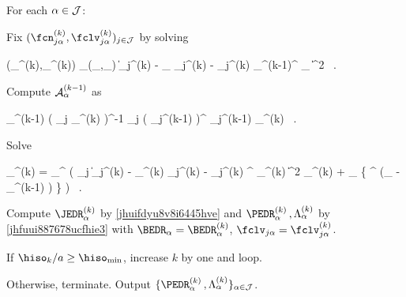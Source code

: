 \begin{mylist}
	\item
	For each \( \alpha \in \mathcal{J} \):
\begin{mylist}
	\item
	Fix \( (\fcn_{\jjl}^{(k)},\fclv_{\jjl}^{(k)})_{j \in \JJJ} \) by solving 
\begin{EQA}[c]
	(\fcn_{\jjl}^{(k)},\fclv_{\jjl}^{(k)})
	\eqdef
	\arginf_{(\fcn_{\jjl},\fclv_{\jjl})}
	\bigl\| \Imav_{j}^{(k)} - \fcn_{\jjl} \Sv_{j}^{(k)} - \UV_{j}^{(k)} {\PEDR_{\jl}^{(k-1)}}^{\T} \fclv_{\jjl} \bigr\|^{2}
	\, .
	\qquad
\label{kiiilfduy543rbgckr7r}
\end{EQA}
%
	\item
	Compute \( \mathcal{A}_{\alpha}^{(k-1)} \) as
\begin{EQA}[c]
	\IEDR_{\jl}^{(k-1)}
	\eqdef
	\biggl( \sum_{j \in \JJJ} \weightM_{\jjl}^{(k)} \biggr)^{-1} 
	\sum_{j \in \JJJ} \bigl( \PEDR_{j}^{(k-1)} \bigr)^{\T} \PEDR_{j}^{(k-1)} \; \weightM_{\jjl}^{(k)}
	\, .
\label{jfu88uuujpvue2rchuu}
\end{EQA}

%
	\item
	Solve
\begin{EQA}[c]
	\BEDR_{\jl}^{(k)}
	=
	\arginf_{\BEDR \in \R^{\dimm \times \dimd}} \biggl( \sum_{j \in \JJJ}
		\bigl\| \Imav_{j}^{(k)} - \fcn_{\jjl}^{(k)} \Sv_{j}^{(k)} - \UV_{j}^{(k)} \BEDR^{\T} \fclv_{\jjl}^{(k)} \bigr\|^{2} 
		\weightM_{\jjl}^{(k)}
		+ \lambda_{\subM} \tr\bigl\{ \BEDR^{\T} \BEDR (\Id_{\dimd}  - \IEDR_{\jl}^{(k-1)} ) \bigr\}
	\biggr)
	\, .
	\qquad
\end{EQA}
%
	\item
	Compute \( \JEDR_{\jl}^{(k)} \) by \eqref{jhuifdyu8v8i6445hve} and 
	\( \PEDR_{\jl}^{(k)} \, , \Lambda_{\jl}^{(k)} \) by \eqref{jhfuui887678ucfhie3}
	with \( \BEDR_{\jl} = \BEDR_{\jl}^{(k)} \), \( \fclv_{\jjl} = \fclv_{\jjl}^{(k)} \).

\end{mylist}


\item
If \( \hiso_{k}/a \geq \hiso_{\min} \), increase \( k \) by one and loop.

\item
Otherwise, terminate.
Output \( \{ \PEDR_{\jl}^{(k)} \, , \Lambda_{\jl}^{(k)} \}_{\jl \in \JJJ} \).
\end{mylist}

